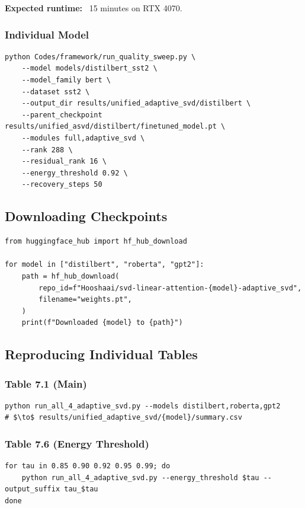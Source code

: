 \textbf{Expected runtime:} ~15 minutes on RTX 4070.

\subsubsection{Individual Model}

\begin{lstlisting}
python Codes/framework/run_quality_sweep.py \
    --model models/distilbert_sst2 \
    --model_family bert \
    --dataset sst2 \
    --output_dir results/unified_adaptive_svd/distilbert \
    --parent_checkpoint results/unified_asvd/distilbert/finetuned_model.pt \
    --modules full,adaptive_svd \
    --rank 288 \
    --residual_rank 16 \
    --energy_threshold 0.92 \
    --recovery_steps 50
\end{lstlisting}

\subsection{Downloading Checkpoints}

\begin{lstlisting}
from huggingface_hub import hf_hub_download

for model in ["distilbert", "roberta", "gpt2"]:
    path = hf_hub_download(
        repo_id=f"Hooshaai/svd-linear-attention-{model}-adaptive_svd",
        filename="weights.pt",
    )
    print(f"Downloaded {model} to {path}")
\end{lstlisting}

\subsection{Reproducing Individual Tables}

\subsubsection{Table 7.1 (Main)}

\begin{lstlisting}
python run_all_4_adaptive_svd.py --models distilbert,roberta,gpt2
# $\to$ results/unified_adaptive_svd/{model}/summary.csv
\end{lstlisting}

\subsubsection{Table 7.6 (Energy Threshold)}

\begin{lstlisting}
for tau in 0.85 0.90 0.92 0.95 0.99; do
    python run_all_4_adaptive_svd.py --energy_threshold $tau --output_suffix tau_$tau
done
\end{lstlisting}


